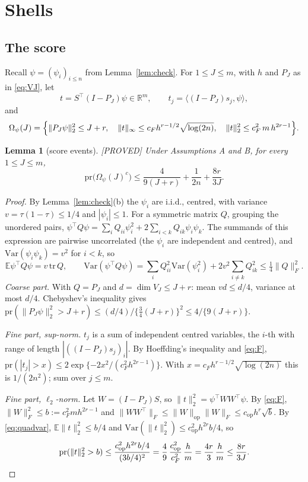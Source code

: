 \documentclass[11pt]{article}
\newtheorem{lemma}{Lemma}
\theoremstyle{definition}
\theoremstyle{remark}
\newcommand{\R}{\mathbb{R}}
\newcommand{\E}{\mathbb{E}}
\newcommand{\pr}{\mathrm{pr}}
\newcommand{\proved}{\textup{[PROVED]}}
\newcommand{\op}{\mathrm{op}}
\begin{document}
\section{Shells}\label{sec:shell}

\subsection{The score}

Recall $\psi=(\psi_i)_{i\le n}$ from Lemma~\ref{lem:check}. For $1\le J\le m$, with $h$ and $P_J$ as in \eqref{eq:VJ}, let
\[
t=S^\top(I-P_J)\psi\in\R^m,\qquad t_j=\langle(I-P_J)s_j,\psi\rangle,
\]
and
\[
\Omega_\psi(J)=\Bigl\{\|P_J\psi\|_2^2\le J+r,\quad \|t\|_\infty\le c_Fh^{r-1/2}\sqrt{\log(2n)},\quad \|t\|_2^2\le c_F^2\,m\,h^{2r-1}\Bigr\}.
\]

\begin{lemma}[score events]\label{lem:score}\proved{}
Under Assumptions A and B, for every $1\le J\le m$,
\[
\pr\bigl(\Omega_\psi(J)^c\bigr)\le\frac{4}{9(J+r)}+\frac1{2n}+\frac{8r}{3J}.
\]
\end{lemma}

\begin{proof}
By Lemma~\ref{lem:check}(b) the $\psi_i$ are i.i.d., centred, with variance $v=\tau(1-\tau)\le1/4$ and $|\psi_i|\le1$. For a symmetric matrix $Q$, grouping the unordered pairs, $\psi^\top Q\psi=\sum_iQ_{ii}\psi_i^2+2\sum_{i<k}Q_{ik}\psi_i\psi_k$. The summands of this expression are pairwise uncorrelated (the $\psi_i$ are independent and centred), and $\mathrm{Var}(\psi_i\psi_k)=v^2$ for $i<k$, so
\begin{equation}\label{eq:quadvar}
\E\psi^\top Q\psi=v\,\mathrm{tr}\,Q,\qquad \mathrm{Var}(\psi^\top Q\psi)=\sum_iQ_{ii}^2\mathrm{Var}(\psi_i^2)+2v^2\sum_{i\ne k}Q_{ik}^2\le\tfrac14\|Q\|_F^2 .
\end{equation}
\emph{Coarse part.} With $Q=P_J$ and $d=\dim V_J\le J+r$: mean $vd\le d/4$, variance at most $d/4$. Chebyshev's inequality gives $\pr(\|P_J\psi\|_2^2>J+r)\le(d/4)/\{\tfrac34(J+r)\}^2\le4/\{9(J+r)\}$.

\emph{Fine part, sup-norm.} $t_j$ is a sum of independent centred variables, the $i$-th with range of length $|((I-P_J)s_j)_i|$. By Hoeffding's inequality and \eqref{eq:F}, $\pr(|t_j|>x)\le2\exp\{-2x^2/(c_F^2h^{2r-1})\}$. With $x=c_Fh^{r-1/2}\sqrt{\log(2n)}$ this is $1/(2n^2)$; sum over $j\le m$.

\emph{Fine part, $\ell_2$-norm.} Let $W=(I-P_J)S$, so $\|t\|_2^2=\psi^\top WW^\top\psi$. By \eqref{eq:F}, $\|W\|_F^2\le b:=c_F^2mh^{2r-1}$ and $\|WW^\top\|_F\le\|W\|_{\op}\|W\|_F\le c_{\op}h^{r}\sqrt b$. By \eqref{eq:quadvar}, $\E\|t\|_2^2\le b/4$ and $\mathrm{Var}(\|t\|_2^2)\le c_{\op}^2h^{2r}b/4$, so
\[
\pr(\|t\|_2^2>b)\le\frac{c_{\op}^2h^{2r}b/4}{(3b/4)^2}=\frac49\,\frac{c_{\op}^2}{c_F^2}\,\frac hm=\frac{4r}{3}\,\frac hm\le\frac{8r}{3J}.\qedhere
\]
\end{proof}
\end{document}

